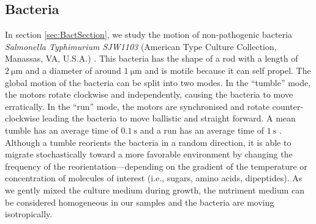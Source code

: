 \documentclass[%
 aip,
 jmp,%
 amsmath,amssymb,
reprint,%
]{revtex4-1}
\newcommand{\tg}[1]{{\color{magenta}#1}} %
\begin{document}
\subsection{Bacteria}
In section \ref{sec:BactSection}, we study the motion of non-pathogenic bacteria \tg{\textit{Salmonella Typhimurium SJW1103}  (American Type Culture Collection, Manassas, VA, U.S.A.)} \citep{21_fabrega2013salmonella}. \tg{This bacteria has the shape of a rod with a length of $\SI{2}{\micro\meter}$ and a diameter of around $\SI{1}{\micro\meter}$ and is motile because it can self propel. The global motion of the bacteria can be split into two modes. In the ``tumble'' mode, the motors rotate clockwise and independently, causing the bacteria to move erratically. In the ``run'' mode, the motors are synchronised and rotate counter-clockwise leading the bacteria to move ballistic and straight forward. A mean tumble has an average time of $\SI{0.1}{\second}$ and a run has an average time of $\SI{1}{\second}$ \citep{5_berg2000motile}. Although a tumble reorients the bacteria in a random direction, it is able to migrate stochastically toward a more favorable environment by changing the frequency of the reorientation—depending on the gradient of the temperature or concentration of molecules of interest (i.e., sugars, amino acids, dipeptides). As we gently mixed the culture medium during growth, the nutriment medium can be considered homogeneous in our samples and the bacteria are moving isotropically.}
\end{document}
